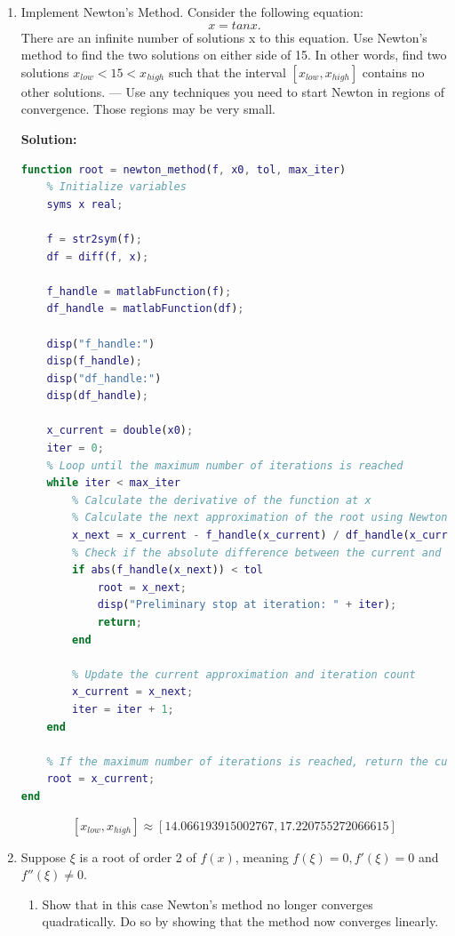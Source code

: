 \documentclass[conference,onecolumn]{IEEEtran}
\begin{document}
\begin{enumerate}[label=\arabic{enumi}.]
          \clearpage
    \item Implement Newton's Method. Consider the following equation:
          $$
              x = tan x.
          $$
          There are an infinite number of solutions x to this equation.
          Use Newton's method to find the two solutions on either side of 15.
          In other words, find two solutions $x_{low} < 15 < x_{high}$ such that the interval $[x_{low}, x_{high}]$ contains no other solutions. — Use any techniques you need to start Newton in regions of convergence.
          Those regions may be very small.

          \textbf{Solution:}

          \begin{lstlisting}[language=MATLAB]
function root = newton_method(f, x0, tol, max_iter)
    % Initialize variables
    syms x real;

    f = str2sym(f);
    df = diff(f, x);

    f_handle = matlabFunction(f);
    df_handle = matlabFunction(df);

    disp("f_handle:")
    disp(f_handle);
    disp("df_handle:")
    disp(df_handle);

    x_current = double(x0);
    iter = 0;
    % Loop until the maximum number of iterations is reached
    while iter < max_iter
        % Calculate the derivative of the function at x
        % Calculate the next approximation of the root using Newton's method
        x_next = x_current - f_handle(x_current) / df_handle(x_current);
        % Check if the absolute difference between the current and next approximation is less than the tolerance
        if abs(f_handle(x_next)) < tol
            root = x_next;
            disp("Preliminary stop at iteration: " + iter);
            return;
        end

        % Update the current approximation and iteration count
        x_current = x_next;
        iter = iter + 1;
    end

    % If the maximum number of iterations is reached, return the current approximation
    root = x_current;
end
          \end{lstlisting}
          $$
              [x_{low}, x_{high}] \approx [14.066193915002767, 17.220755272066615]
          $$

          \clearpage
    \item Suppose $\xi$ is a root of order 2 of $f(x)$, meaning $f(\xi) = 0, f'(\xi) = 0$ and $f''(\xi) \neq 0$.
          \begin{enumerate}
              \item Show that in this case Newton's method no longer converges quadratically.
                    Do so by showing that the method now converges linearly.


\end{enumerate}
\end{enumerate}
\end{document}
